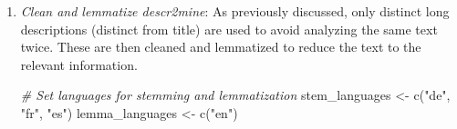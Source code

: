 \documentclass[
]{article}
\newenvironment{Shaded}{\begin{snugshade}}{\end{snugshade}}
\newcommand{\AttributeTok}[1]{\textcolor[rgb]{0.77,0.63,0.00}{#1}}
\newcommand{\CommentTok}[1]{\textcolor[rgb]{0.56,0.35,0.01}{\textit{#1}}}
\newcommand{\ConstantTok}[1]{\textcolor[rgb]{0.00,0.00,0.00}{#1}}
\newcommand{\FunctionTok}[1]{\textcolor[rgb]{0.00,0.00,0.00}{#1}}
\newcommand{\NormalTok}[1]{#1}
\newcommand{\OtherTok}[1]{\textcolor[rgb]{0.56,0.35,0.01}{#1}}
\newcommand{\SpecialCharTok}[1]{\textcolor[rgb]{0.00,0.00,0.00}{#1}}
\newcommand{\StringTok}[1]{\textcolor[rgb]{0.31,0.60,0.02}{#1}}
\begin{document}
\begin{enumerate}
\begin{enumerate}
\begin{Shaded}
\end{Shaded}
  \item
    \emph{Clean and lemmatize descr2mine}: As previously discussed, only distinct long descriptions (distinct from title) are used to avoid analyzing the same text twice. These are then cleaned and lemmatized to reduce the text to the relevant information.

\begin{Shaded}
\begin{Highlighting}[]
\CommentTok{\# Set languages for stemming and lemmatization}
\NormalTok{stem\_languages }\OtherTok{\textless{}{-}} \FunctionTok{c}\NormalTok{(}\StringTok{"de"}\NormalTok{, }\StringTok{"fr"}\NormalTok{, }\StringTok{"es"}\NormalTok{)}
\NormalTok{lemma\_languages }\OtherTok{\textless{}{-}} \FunctionTok{c}\NormalTok{(}\StringTok{"en"}\NormalTok{)}


\end{Highlighting}
\end{Shaded}
\end{enumerate}
\end{enumerate}
\end{document}
